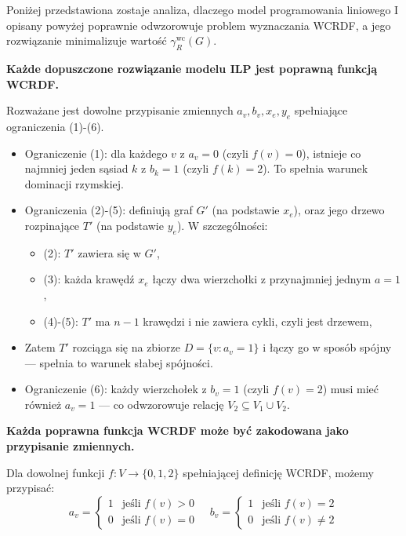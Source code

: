 Poniżej przedstawiona zostaje analiza, dlaczego model programowania liniowego I opisany powyżej poprawnie odwzorowuje problem wyznaczania WCRDF, a jego rozwiązanie minimalizuje wartość $\gamma_R^{\text{wc}}(G)$.

\textbf{Każde dopuszczone rozwiązanie modelu ILP jest poprawną funkcją WCRDF.}

Rozważane jest dowolne przypisanie zmiennych $a_v, b_v, x_e, y_e$ spełniające ograniczenia (1)-(6).

\begin{itemize}
    \item Ograniczenie (1): dla każdego $v$ z $a_v = 0$ (czyli $f(v) = 0$), istnieje co najmniej jeden sąsiad $k$ z $b_k = 1$ (czyli $f(k) = 2$). To spełnia warunek dominacji rzymskiej.
    
    \item Ograniczenia (2)-(5): definiują graf $G'$ (na podstawie $x_e$), oraz jego drzewo rozpinające $T'$ (na podstawie $y_e$). W szczególności:
    \begin{itemize}
        \item (2): $T'$ zawiera się w $G'$,
        \item (3): każda krawędź $x_e$ łączy dwa wierzchołki z przynajmniej jednym $a = 1$,
        \item (4)-(5): $T'$ ma $n-1$ krawędzi i nie zawiera cykli, czyli jest drzewem,
    \end{itemize}
    \item Zatem $T'$ rozciąga się na zbiorze $D = \{v : a_v = 1\}$ i łączy go w sposób spójny — spełnia to warunek słabej spójności.
    
    \item Ograniczenie (6): każdy wierzchołek z $b_v = 1$ (czyli $f(v) = 2$) musi mieć również $a_v = 1$ — co odwzorowuje relację $V_2 \subseteq V_1 \cup V_2$.
\end{itemize}

\textbf{Każda poprawna funkcja WCRDF może być zakodowana jako przypisanie zmiennych.}

Dla dowolnej funkcji $f : V \to \{0,1,2\}$ spełniającej definicję WCRDF, możemy przypisać:
\[
a_v = \begin{cases}
1 & \text{jeśli } f(v) > 0 \\
0 & \text{jeśli } f(v) = 0
\end{cases}
\quad
b_v = \begin{cases}
1 & \text{jeśli } f(v) = 2 \\
0 & \text{jeśli } f(v) \ne 2
\end{cases}
\]

